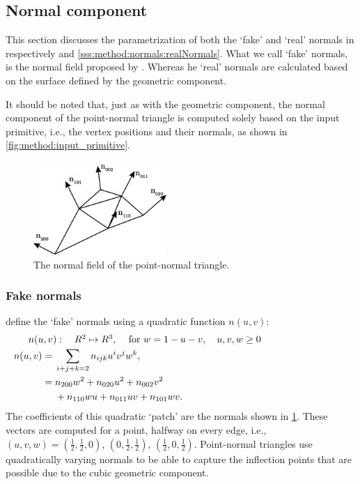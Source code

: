 
\subsection{Normal component}
\label{ss:normal_component}
	This section discusses the parametrization of both the `fake' and `real' normals in respectively  and \ref{sss:method:normals:realNormals}. What we call `fake' normals, is the normal field proposed by \citeauthor{vlachos2001curved}. Whereas he `real' normals are calculated based on the surface defined by the geometric component.

	It should be noted that, just as with the geometric component, the normal component of the point-normal triangle is computed solely based on the input primitive, i.e., the vertex positions and their normals, as shown in \cref{fig:method:input_primitive}. 

	\begin{figure}
		\centering
		\includegraphics[width=0.45\textwidth]{./content/img/method/normals.png}
		\caption{The normal field of the point-normal triangle.}
		\label{fig:method:normal_field}
	\end{figure}

\subsubsection{Fake normals}
\label{sss:method:normals:fakeNormals}
	\citeauthor{vlachos2001curved} define the `fake' normals using a quadratic function $n(u,v)$:
	\begin{align}
		\noalign{$n(u,v): \quad R^2 \mapsto R^3,\quad$ for $w = 1 - u - v, \quad u, v, w \geq 0$}
		\begin{split}\label{eq:method:quadratic_normal_patch}
		    n(u,v) ={}& \sum_{i + j + k = 2} n_{ijk}u^i v^j w^k,\\
		      	   ={}& n_{200}w^2 + n_{020}u^2 + n_{002}v^2\\
		      	    {}& + n_{110}wu + n_{011}uv + n_{101}wv.\\
		\end{split}
	\end{align}
	The coefficients of this quadratic `patch' are the normals shown in \cref{fig:method:normal_field}. These vectors are computed for a point, halfway on every edge, i.e., $(u,v,w) = (\frac{1}{2}, \frac{1}{2}, 0)$, $(0, \frac{1}{2}, \frac{1}{2})$, $(\frac{1}{2}, 0, \frac{1}{2})$. Point-normal triangles use quadratically varying normals to be able to capture the inflection points that are possible due to the cubic geometric component. 


